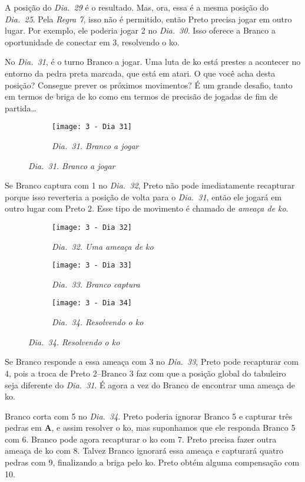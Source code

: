 A posição do \emph{Dia.\@~29} é o resultado. Mas, ora, essa é a mesma posição do \emph{Dia.\@~25}. Pela \emph{Regra 7}, isso não é permitido, então Preto precisa jogar em outro lugar. Por exemplo, ele poderia jogar 2 no \emph{Dia.\@~30}. Isso oferece a Branco a oportunidade de conectar em 3, resolvendo o ko.

No \emph{Dia.\@~31}, é o turno Branco a jogar. Uma luta de ko está prestes a acontecer no entorno da pedra preta marcada, que está em atari. O que você acha desta posição? Consegue prever os próximos movimentos? É um grande desafio, tanto em termos de briga de ko como em termos de precisão de jogadas de fim de partida\ldots

\begin{figure}[h]
    \centering
    \begin{subfigure}[t]{.4\textwidth}
        \centering
        \texttt{[image: 3 - Dia 31]}
        \caption*{\emph{Dia.\@~31. Branco a jogar}}
    \end{subfigure}
\end{figure}

\pagebreak

Se Branco captura com 1 no \emph{Dia.\@~32}, Preto não pode imediatamente recapturar porque isso reverteria a posição de volta para o \emph{Dia.\@~31}, então ele jogará em outro lugar com Preto 2. Esse tipo de movimento é chamado de \emph{ameaça de ko}.

\begin{figure}[h]
  \centering
  \begin{subfigure}[t]{.3\textwidth}
      \centering
      \texttt{[image: 3 - Dia 32]}
      \caption*{\emph{Dia.\@~32. Uma ameaça de ko}}
  \end{subfigure}
  \hfill
  \begin{subfigure}[t]{.3\textwidth}
      \centering
      \texttt{[image: 3 - Dia 33]}
      \caption*{\emph{Dia.\@~33. Branco captura}}
  \end{subfigure}
  \hfill
  \begin{subfigure}[t]{.3\textwidth}
      \centering
      \texttt{[image: 3 - Dia 34]}
      \caption*{\emph{Dia.\@~34. Resolvendo o ko}}
  \end{subfigure}
\end{figure}

Se Branco responde a essa ameaça com 3 no \emph{Dia.\@~33}, Preto pode recapturar com 4, pois a troca de Preto 2--Branco 3 faz com que a posição global do tabuleiro seja diferente do \emph{Dia.\@~31}. É agora a vez do Branco de encontrar uma ameaça de ko.

Branco corta com 5 no \emph{Dia.\@~34}. Preto poderia ignorar Branco 5 e capturar três pedras em \textbf{A}, e assim  resolver o ko, mas suponhamos que ele responda Branco 5 com 6. Branco pode agora recapturar o ko com 7. Preto precisa fazer outra ameaça de ko com 8. Talvez Branco ignorará essa ameaça e capturará quatro pedras com 9, finalizando a briga pelo ko. Preto obtém alguma compensação com 10.